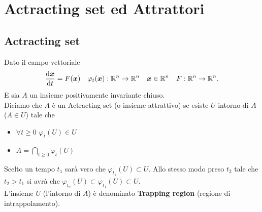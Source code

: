 \section{Actracting set ed Attrattori}%
\subsection{Actracting set}%
\begin{defn}
    Dato il campo vettoriale
    \[
	\frac{\text{d} \boldsymbol{x}}{\text{d} t} = F(\boldsymbol{x}) \quad  \varphi_t(\boldsymbol{x}):\mathbb{R}^n\to \mathbb{R}^n \quad\boldsymbol{x}\in \mathbb{R}^n \quad  F:\mathbb{R}^n\to \mathbb{R}^n
    .\] 
    E sia $A$ un insieme positivamente invariante chiuso. \\
    Diciamo che $A$ è un Actracting set (o insieme attrattivo) se esiste $U$ intorno di $A$ ($A\in U$) tale che 
    \begin{itemize}
	\item $\forall t \ge 0$ $\varphi_t(U) \in U$ 
	\item $A = \bigcap\limits_{t\ge 0}\varphi_t(U)$
    \end{itemize}
\end{defn}
\noindent
Scelto un tempo $t_1$ sarà vero che $\varphi_{t_1}(U) \subset U$. Allo stesso modo preso $t_2$ tale che $t_2>t_1$  si avrà che $\varphi_{t_2}(U) \subset \varphi_{t_1}(U) \subset U$.\\
L'insieme $U$ (l'intorno di $A$) è denominato \textbf{Trapping region} (regione di intrappolamento). 

